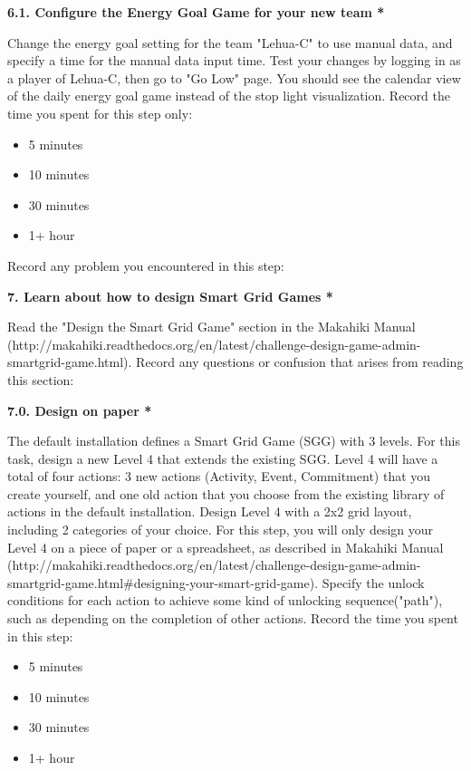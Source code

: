{\bf 6.1. Configure the Energy Goal Game for your new team *}

Change the energy goal setting for the team "Lehua-C" to use manual data, and specify a time for the manual data input time. Test your changes by logging in as a player of Lehua-C, then go to "Go Low" page. You should see the calendar view of the daily energy goal game instead of the stop light visualization. Record the time you spent for this step only:

\begin{itemize}
\item 5 minutes
\item  10 minutes
\item  30 minutes
\item  1+ hour
\end{itemize}


Record any problem you encountered in this step:

{\bf 7. Learn about how to design Smart Grid Games *}

Read the "Design the Smart Grid Game" section in the Makahiki Manual (http://makahiki.readthedocs.org/en/latest/challenge-design-game-admin-smartgrid-game.html). Record any questions or confusion that arises from reading this section:

{\bf 7.0. Design on paper *}

The default installation defines a Smart Grid Game (SGG) with 3 levels. For this task, design a new Level 4 that extends the existing SGG. Level 4 will have a total of four actions: 3 new actions (Activity, Event, Commitment) that you create yourself, and one old action that you choose from the existing library of actions in the default installation. Design Level 4 with a 2x2 grid layout, including 2 categories of your choice. For this step, you will only design your Level 4 on a piece of paper or a spreadsheet, as described in Makahiki Manual (http://makahiki.readthedocs.org/en/latest/challenge-design-game-admin-smartgrid-game.html\#designing-your-smart-grid-game). Specify the unlock conditions for each action to achieve some kind of unlocking sequence("path"), such as depending on the completion of other actions. Record the time you spent in this step:

\begin{itemize}
\item 5 minutes
\item  10 minutes
\item  30 minutes
\item  1+ hour
\end{itemize}


